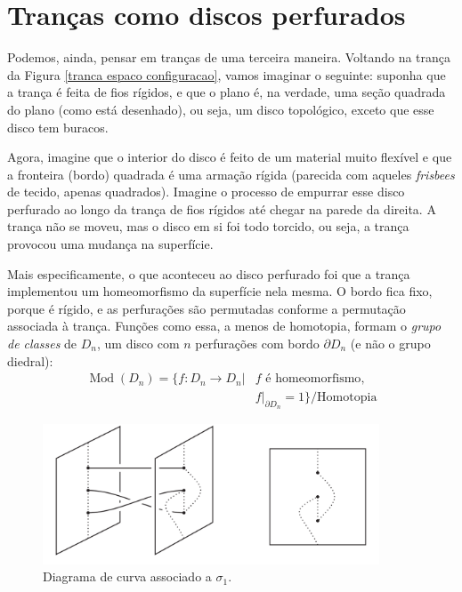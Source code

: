 \documentclass[a4paper,portuguese,11pt,twoside, leqno]{book}
\DeclareMathOperator{\Mod}{Mod}
\theoremstyle{definition}
\begin{document}
	\section{Tranças como discos perfurados}\label{secao trancas como discos perfurados}
	\hspace{12pt} Podemos, ainda, pensar em tranças de uma terceira maneira. Voltando na trança da Figura \eqref{tranca espaco configuracao}, vamos imaginar o seguinte: suponha que a trança é feita de fios rígidos, e que o plano é, na verdade, uma seção quadrada do plano (como está desenhado), ou seja, um disco topológico, exceto que esse disco tem buracos.
	\par\vspace{0.3cm} Agora, imagine que o interior do disco é feito de um material muito flexível e que a fronteira (bordo) quadrada é uma armação rígida (parecida com aqueles \textit{frisbees} de tecido, apenas quadrados). Imagine o processo de empurrar esse disco perfurado ao longo da trança de fios rígidos até chegar na parede da direita. A trança não se moveu, mas o disco em si foi todo torcido, ou seja, a trança provocou uma mudança na superfície.
	\par\vspace{0.3cm} Mais especificamente, o que aconteceu ao disco perfurado foi que a trança implementou um homeomorfismo da superfície nela mesma. O bordo fica fixo, porque é rígido, e as perfurações são permutadas conforme a permutação associada à trança. Funções como essa, a menos de homotopia, formam o \textit{grupo de classes} de $D_n$, um disco com $n$ perfurações com bordo $\partial D_n$ (e não o grupo diedral):
	\begin{align*}
	\Mod(D_n) = \{ f:D_n\to D_n|& f\text{ é homeomorfismo}, \\
	&f|_{\partial D_n} = 1 \}/\text{Homotopia}
	\end{align*}
	
	\begin{figure}[H]
		\begin{center}
			\includegraphics[width=10cm]{tranca_disco_perfurado.png}
		\end{center}\caption{Diagrama de curva associado a $\sigma_1$.}
		\label{tranca disco perfurado}
	\end{figure}
	
\end{document}

